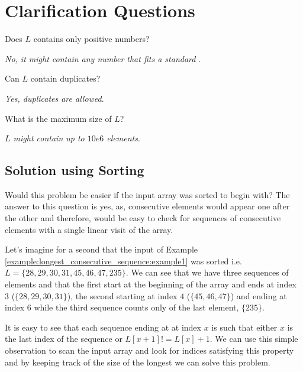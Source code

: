 \section{Clarification Questions}

\begin{QandA}
	\item Does $L$ contains only positive numbers?
	\begin{answered}
		\textit{No, it might contain any number that fits a standard }.
	\end{answered}

	\item Can $L$ contain duplicates?
	\begin{answered}
		\textit{Yes, duplicates are allowed}.
	\end{answered}

	\item What is the maximum size of $L$?
	\begin{answered}
		\textit{$L$ might contain up to $10e6$ elements}.
	\end{answered}
	
\end{QandA}

\subsection{Solution using Sorting}
\label{longest_consecutive_sequence:sec:bruteforce}
Would this problem be easier if the input array was sorted to begin with? 
The answer to this question is yes, as, consecutive elements would appear one after the other and therefore, would be easy to check for sequences of consecutive elements with a single linear visit of the array.

Let's imagine for a second that the input of  Example \ref{example:longest_consecutive_sequence:example1} was sorted i.e. $L=\{28,29,30,31,45,46,47,235\}$. We can see that we have three sequences of elements and that the first start at the beginning of the array and ends at index $3$ ($\{28,29,30,31\}$), the second starting at index $4$ ($\{45,46,47\}$) and ending at index $6$ while the third sequence counts only of the last element, $\{235\}$.

It is easy to see that each sequence ending at at index $x$ is such that either $x$ is the last index of the sequence or $L[x+1] != L[x]+1$.
We can use this simple observation to scan the input array and look for indices satisfying this property and by keeping track of the size of the longest we can solve this problem.

